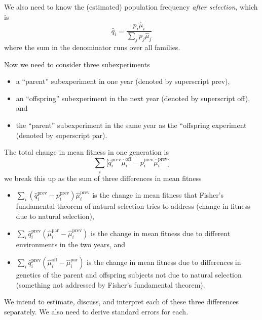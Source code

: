 \documentclass[11pt]{article}
\begin{document}
We also need to know the (estimated) population frequency
\emph{after selection}, which is
$$
   \hat{q}_i = \frac{p_i \hat{\mu}_i}{\sum_j p_j \hat{\mu}_j}
$$
where the sum in the denominator runs over all families.

Now we need to consider three subexperiments
\begin{itemize}
\item a ``parent'' subexperiment in one year (denoted by superscript prev),
\item an ``offspring'' subexperiment in the next year (denoted
    by superscript off), and
\item the ``parent'' subexperiment in the same year as the ``offspring
    experiment (denoted by superscript par).
\end{itemize}

The total change in mean fitness in one generation is
$$
   \textstyle \sum_i \bigl[
   \hat{q}_i^\text{prev} \hat{\mu}_i^\text{off}
   -
   p_i^\text{prev} \hat{\mu}_i^\text{prev}
   \bigr]
$$
we break this up as the sum of three differences in mean fitness
\begin{itemize}
\item $\sum_i (\hat{q}_i^\text{prev} - p_i^\text{prev}) \hat{\mu}_i^\text{prev}$
    is the change in mean fitness that Fisher's fundamental theorem of
    natural selection tries to address (change in fitness due to natural
    selection),
\item $\sum_i \hat{q}_i^\text{prev} (\hat{\mu}_i^\text{par} -
    \hat{\mu}_i^\text{prev})$
    is the change in mean fitness due to different environments in the
    two years, and
\item $\sum_i \hat{q}_i^\text{prev} (\hat{\mu}_i^\text{off} -
    \hat{\mu}_i^\text{par})$
    is the change in mean fitness due to differences in genetics of the
    parent and offspring subjects not due to natural selection
    (something not addressed by Fisher's fundamental theorem).
\end{itemize}
We intend to estimate, discuss, and interpret each of these three differences
separately.  We also need to derive standard errors for each.
\end{document}
